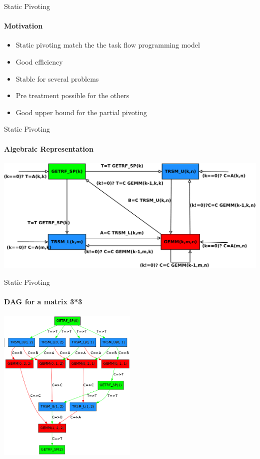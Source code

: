 \begin{frame}{Static Pivoting}
\framesubtitle{Motivation}
\begin{itemize}
\item Static pivoting match the the task flow programming model
\item Good efficiency
\item Stable for several problems
\item Pre treatment possible for the others
\item Good upper bound for the partial pivoting
\end{itemize}
\end{frame}

\begin{frame}{Static Pivoting}
\framesubtitle{Algebraic Representation}
\begin{center}
\includegraphics[scale=0.2]{dag_getrf_sp.pdf} 
\end{center}
\end{frame}

\begin{frame}{Static Pivoting}
\framesubtitle{DAG for a matrix 3*3}
\begin{center}
\includegraphics[width=0.5\textwidth]{dag33.png} 
\end{center}
\end{frame}
